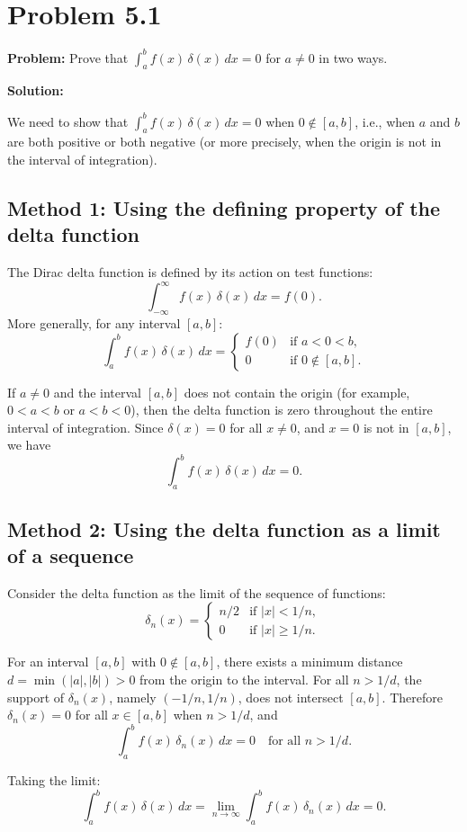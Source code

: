 \documentclass[12pt]{article}
\begin{document}
\section*{Problem 5.1}

\textbf{Problem:} Prove that $\displaystyle\int_a^b f(x)\,\delta(x)\,dx = 0$ for $a \neq 0$ in two ways.

\bigskip
\textbf{Solution:}

We need to show that $\int_a^b f(x)\,\delta(x)\,dx = 0$ when $0 \notin [a,b]$, i.e., when $a$ and $b$ are both positive or both negative (or more precisely, when the origin is not in the interval of integration).

\subsection*{Method 1: Using the defining property of the delta function}

The Dirac delta function is defined by its action on test functions:
\[
\int_{-\infty}^{\infty} f(x)\,\delta(x)\,dx = f(0).
\]
More generally, for any interval $[a,b]$:
\[
\int_a^b f(x)\,\delta(x)\,dx = \begin{cases} f(0) & \text{if } a < 0 < b, \\ 0 & \text{if } 0 \notin [a,b]. \end{cases}
\]

If $a \neq 0$ and the interval $[a,b]$ does not contain the origin (for example, $0 < a < b$ or $a < b < 0$), then the delta function is zero throughout the entire interval of integration. Since $\delta(x) = 0$ for all $x \neq 0$, and $x = 0$ is not in $[a,b]$, we have
\[
\int_a^b f(x)\,\delta(x)\,dx = 0.
\]

\subsection*{Method 2: Using the delta function as a limit of a sequence}

Consider the delta function as the limit of the sequence of functions:
\[
\delta_n(x) = \begin{cases} n/2 & \text{if } |x| < 1/n, \\ 0 & \text{if } |x| \geq 1/n. \end{cases}
\]

For an interval $[a,b]$ with $0 \notin [a,b]$, there exists a minimum distance $d = \min(|a|, |b|) > 0$ from the origin to the interval. For all $n > 1/d$, the support of $\delta_n(x)$, namely $(-1/n, 1/n)$, does not intersect $[a,b]$. Therefore $\delta_n(x) = 0$ for all $x \in [a,b]$ when $n > 1/d$, and
\[
\int_a^b f(x)\,\delta_n(x)\,dx = 0 \quad \text{for all } n > 1/d.
\]

Taking the limit:
\[
\int_a^b f(x)\,\delta(x)\,dx = \lim_{n \to \infty} \int_a^b f(x)\,\delta_n(x)\,dx = 0.
\]
\end{document}
